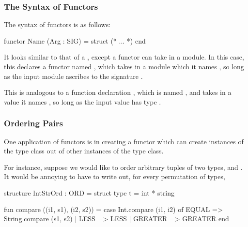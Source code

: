 \documentclass[aspectratio=169, handout]{beamer}
\begin{document}
\begin{frame}[fragile]
  \frametitle{The Syntax of Functors}

  The syntax of functors is as follows:

  \begin{codeblock}
    functor Name (Arg : SIG) =
      struct
        (* ... *)
      end
  \end{codeblock}

  \pause
  \vspace{\fill}

  It looks similar to that of a , except a functor can take in
  a module. In this case, this declares a functor named , which takes
  in a module which it names , so long as the input module ascribes to
  the signature .

  \pause
  \vspace{\fill}

  This is analogous to a function declaration , which is named , and takes in a value it names ,
  so long as the input value has type .
\end{frame}

\begin{frame}[fragile]
  \frametitle{Ordering Pairs}

  One application of functors is in creating a functor which can create instances
  of the  type class out of other instances of the  type class.

  \pause
  \vspace{\fill}

  For instance, suppose we would like to order arbitrary tuples of two types,
   and . It would be annoying to have to write out, for every
  permutation of types,

  \pause
  \vspace{\fill}

  \begin{codeblock}
    structure IntStrOrd : ORD =
      struct
        type t = int * string

        fun compare ((i1, s1), (i2, s2)) =
          case Int.compare (i1, i2) of
            EQUAL   => String.compare (s1, s2)
          | LESS    => LESS
          | GREATER => GREATER
      end
  \end{codeblock}
\end{frame}
\end{document}
